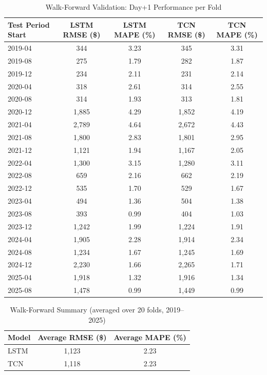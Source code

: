\documentclass[12pt]{article}
\begin{document}
\begin{table}[h!]
\centering
\small
\caption{Walk-Forward Validation: Day+1 Performance per Fold}
\label{tab:walkforward}
\begin{tabular}{@{}lcccc@{}}
\toprule
\textbf{Test Period Start} & \textbf{LSTM RMSE (\$)} & \textbf{LSTM MAPE (\%)} & \textbf{TCN RMSE (\$)} & \textbf{TCN MAPE (\%)} \\
\midrule
2019-04 & 344 & 3.23 & 345 & 3.31 \\
2019-08 & 275 & 1.79 & 282 & 1.87 \\
2019-12 & 234 & 2.11 & 231 & 2.14 \\
2020-04 & 318 & 2.61 & 314 & 2.55 \\
2020-08 & 314 & 1.93 & 313 & 1.81 \\
2020-12 & 1{,}885 & 4.29 & 1{,}852 & 4.19 \\
2021-04 & 2{,}789 & 4.64 & 2{,}672 & 4.43 \\
2021-08 & 1{,}800 & 2.83 & 1{,}801 & 2.95 \\
2021-12 & 1{,}121 & 1.94 & 1{,}167 & 2.05 \\
2022-04 & 1{,}300 & 3.15 & 1{,}280 & 3.11 \\
2022-08 &   659 & 2.16 &   662 & 2.19 \\
2022-12 &   535 & 1.70 &   529 & 1.67 \\
2023-04 &   494 & 1.36 &   504 & 1.38 \\
2023-08 &   393 & 0.99 &   404 & 1.03 \\
2023-12 & 1{,}242 & 1.99 & 1{,}224 & 1.91 \\
2024-04 & 1{,}905 & 2.28 & 1{,}914 & 2.34 \\
2024-08 & 1{,}234 & 1.67 & 1{,}245 & 1.69 \\
2024-12 & 2{,}230 & 1.66 & 2{,}265 & 1.71 \\
2025-04 & 1{,}918 & 1.32 & 1{,}916 & 1.34 \\
2025-08 & 1{,}478 & 0.99 & 1{,}449 & 0.99 \\
\bottomrule
\end{tabular}
\end{table}

\begin{table}[h!]
\centering
\small
\caption{Walk-Forward Summary (averaged over 20 folds, 2019--2025)}
\label{tab:walkforward-summary}
\begin{tabular}{@{}lcc@{}}
\toprule
\textbf{Model} & \textbf{Average RMSE (\$)} & \textbf{Average MAPE (\%)} \\
\midrule
LSTM & 1{,}123 & 2.23 \\
TCN  & 1{,}118 & 2.23 \\
\bottomrule
\end{tabular}
\end{table}
\end{document}
